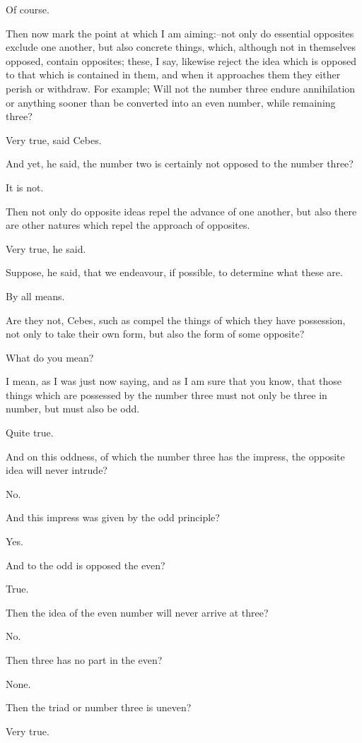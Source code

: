 Of course.

Then now mark the point at which I am aiming:--not only do essential
opposites exclude one another, but also concrete things, which, although
not in themselves opposed, contain opposites; these, I say, likewise
reject the idea which is opposed to that which is contained in them,
and when it approaches them they either perish or withdraw. For example;
Will not the number three endure annihilation or anything sooner than be
converted into an even number, while remaining three?

Very true, said Cebes.

And yet, he said, the number two is certainly not opposed to the number
three?

It is not.

Then not only do opposite ideas repel the advance of one another, but
also there are other natures which repel the approach of opposites.

Very true, he said.

Suppose, he said, that we endeavour, if possible, to determine what
these are.

By all means.

Are they not, Cebes, such as compel the things of which they have
possession, not only to take their own form, but also the form of some
opposite?

What do you mean?

I mean, as I was just now saying, and as I am sure that you know, that
those things which are possessed by the number three must not only be
three in number, but must also be odd.

Quite true.

And on this oddness, of which the number three has the impress, the
opposite idea will never intrude?

No.

And this impress was given by the odd principle?

Yes.

And to the odd is opposed the even?

True.

Then the idea of the even number will never arrive at three?

No.

Then three has no part in the even?

None.

Then the triad or number three is uneven?

Very true.

